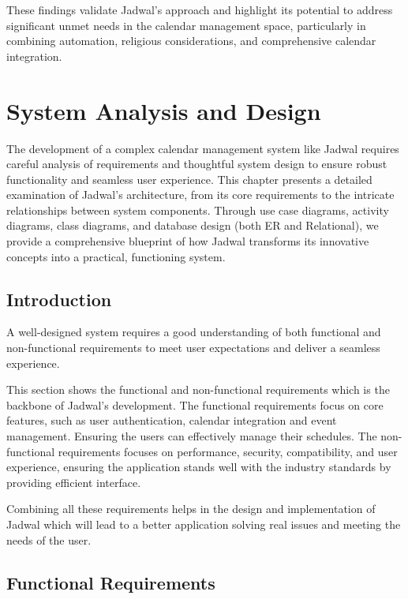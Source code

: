 \documentclass[12pt,a4paper,twoside]{report}
\begin{document}
These findings validate Jadwal's approach and highlight its potential to address significant unmet needs in the calendar management space, particularly in combining automation, religious considerations, and comprehensive calendar integration.

\chapter{System Analysis and Design}

The development of a complex calendar management system like Jadwal requires careful analysis of requirements and thoughtful system design to ensure robust functionality and seamless user experience. This chapter presents a detailed examination of Jadwal's architecture, from its core requirements to the intricate relationships between system components. Through use case diagrams, activity diagrams, class diagrams, and database design (both ER and Relational), we provide a comprehensive blueprint of how Jadwal transforms its innovative concepts into a practical, functioning system.

\section{Introduction}

A well-designed system requires a good understanding of both functional and non-functional requirements to meet user expectations and deliver a seamless experience.

This section shows the functional and non-functional requirements which is the backbone of Jadwal's development. The functional requirements focus on core features, such as user authentication, calendar integration and event management. Ensuring the users can effectively manage their schedules. The non-functional requirements focuses on performance, security, compatibility, and user experience, ensuring the application stands well with the industry standards by providing efficient interface.

Combining all these requirements helps in the design and implementation of Jadwal which will lead to a better application solving real issues and meeting the needs of the user.

\section{Functional Requirements}
\end{document}
